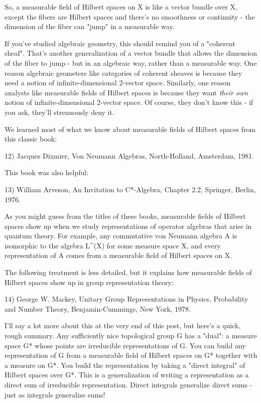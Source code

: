 So, a measurable field of Hilbert spaces on X is like a vector bundle
over X, except the fibers are Hilbert spaces and there's no smoothness
or continuity - the dimension of the fiber can "jump" in a measurable
way.  

If you've studied algebraic geometry, this should remind you of a
"coherent sheaf".  That's another generalization of a vector
bundle that allows the dimension of the fiber to jump - but in an
algebraic way, rather than a measurable way.  One reason algebraic
geometers like categories of coherent sheaves is because they need a
notion of infinite-dimensional 2-vector space.  Similarly, one reason
analysts like measurable fields of Hilbert spaces is because they want
\emph{their own} notion of infinite-dimensional 2-vector space.  Of
course, they don't know this - if you ask, they'll strenuously deny
it.

We learned most of what we know about measurable fields of Hilbert 
spaces from this classic book:

12) Jacques Dixmier, Von Neumann Algebras, North-Holland, Amsterdam, 
1981.

This book was also helpful:

13) William Arveson, An Invitation to C*-Algebra, Chapter 2.2,
Springer, Berlin, 1976.

As you might guess from the titles of these books, measurable fields
of Hilbert spaces show up when we study representations of operator
algebras that arise in quantum theory.  For example, any commutative
von Neumann algebra A is isomorphic to the algebra
L^{\infty }(X) for some measure space X, and every
representation of A comes from a measurable field of Hilbert spaces on
X.

The following treatment is less detailed, but it explains how 
measurable fields of Hilbert spaces show up in group representation 
theory:

14) George W. Mackey, Unitary Group Representations in Physics, 
Probability and Number Theory, Benjamin-Cummings, New York, 1978.

I'll say a lot more about this at the very end of this post, but
here's a quick, rough summary.  Any sufficiently nice topological
group G has a "dual": a measure space G* whose points are
irreducible representations of G.  You can build any representation of
G from a measurable field of Hilbert spaces on G* together with a
measure on G*.  You build the representation by taking a "direct
integral" of Hilbert spaces over G*.  This is a generalization of
writing a representation as a direct sum of irreducible
representation.  Direct integrals generalize direct sums - just as
integrals generalize sums!

